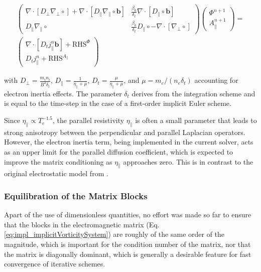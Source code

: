 \begin{align}
	\begin{pmatrix}
		\nabla \cdot \left[ D_\perp \nabla_\perp \circ \right] + \nabla \cdot \left[ D_\parallel \nabla_\parallel \circ \mathbf{b} \right]  
		& \frac{\beta_0}{\delta_t} \nabla \cdot \left[ D_\parallel \circ \mathbf{b} \right] \\
		D_\parallel \nabla_\parallel \circ &
		\frac{\beta_0}{\delta_t} D_\parallel \circ - \nabla \cdot \left[ \nabla_\perp \circ \right]
	\end{pmatrix}
	\begin{pmatrix}
		\Phi^{n+1} \\ A_\parallel^{n+1}
	\end{pmatrix} 
	= \nonumber \\
	\begin{pmatrix}
		\nabla \cdot \left[ D_t j^{n}_\parallel \mathbf{b} \right] + \text{RHS}^\Phi \\
		D_t j^{n}_\parallel + \text{RHS}^{A_\parallel}
	\end{pmatrix}
	\label{eq:impl_implicitVorticitySystem}
\end{align}

with $D_\perp = \frac{m_i n_i}{B^2 \delta_t}$, $D_\parallel = \frac{1}{\eta_\parallel + \mu}$, $D_t = \frac{\mu}{\eta_\parallel + \mu}$, and $\mu = m_e / (n_e \delta_t)$ accounting for electron inertia effects. The parameter $\delta_t$ derives from the integration scheme and is equal to the time-step in the case of a first-order implicit Euler scheme. \newline

Since $\eta_\parallel \propto T_e^{-1.5}$, the parallel resistivity $\eta_\parallel$ is often a small parameter that leads to strong anisotropy between the perpendicular and parallel Laplacian operators. However, the electron inertia term, being implemented in the current solver, acts as an upper limit for the parallel diffusion coefficient, which is expected to improve the matrix conditioning as $\eta_\parallel$ approaches zero. This is in contrast to the original electrostatic model from \cite{Bufferand2021}. \newline


\subsubsection{Equilibration of the Matrix Blocks}
\label{ssec:equilibrationBLockMatrices}
Apart of the use of dimensionless quantities, no effort was made so far to ensure that the blocks in the electromagnetic matrix (Eq. \ref{eq:impl_implicitVorticitySystem}) are roughly of the same order of the magnitude, which is important for the condition number of the matrix, nor that the matrix is diagonally dominant, which is generally a desirable feature for fast convergence of iterative schemes. \\

